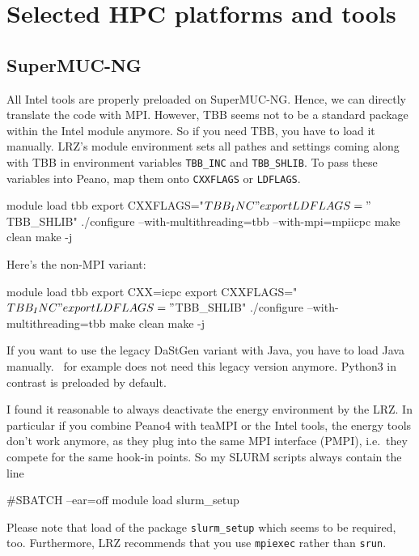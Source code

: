 \chapter{Selected HPC platforms and tools}
\label{chapter:selected-HPC-platforms}


\section{SuperMUC-NG}

% 

All Intel tools are properly preloaded on SuperMUC-NG.
Hence, we can directly translate the code with MPI. 
However, TBB seems not to be a standard package within the Intel module anymore. 
So if you need TBB, you have to load it manually.
LRZ's module environment sets all pathes and settings coming along with TBB in
environment variables \texttt{TBB\_INC} and \texttt{TBB\_SHLIB}.
To pass these variables into Peano, map them onto \texttt{CXXFLAGS} or
\texttt{LDFLAGS}.

\begin{code}
 module load tbb
 export CXXFLAGS="$TBB_INC"
 export LDFLAGS="$TBB_SHLIB"
 ./configure --with-multithreading=tbb --with-mpi=mpiicpc
 make clean
 make -j
\end{code}


\noindent
Here's the non-MPI variant:

\begin{code}
 module load tbb
 export CXX=icpc
 export CXXFLAGS="$TBB_INC"
 export LDFLAGS="$TBB_SHLIB"
 ./configure --with-multithreading=tbb
 make clean
 make -j
\end{code}


\noindent
If you want to use the legacy DaStGen variant with Java, you have to load
Java manually.
\ExaHyPE\ for example does not need this legacy version anymore.
Python3 in contrast is preloaded by default.


\begin{remark}
 I found it reasonable to always deactivate the energy environment by the LRZ.
 In particular if you combine Peano4 with teaMPI or the Intel tools, the energy
 tools don't work anymore, as they plug into the same MPI interface (PMPI),
 i.e.~they compete for the same hook-in points. So my SLURM scripts always
 contain the line
 \begin{code}
#SBATCH --ear=off
module load slurm_setup
 \end{code}
 Please note that load of the package \texttt{slurm\_setup} which seems to be
 required, too.
 Furthermore, LRZ recommends that you use \texttt{mpiexec} rather than
 \texttt{srun}.
\end{remark}




